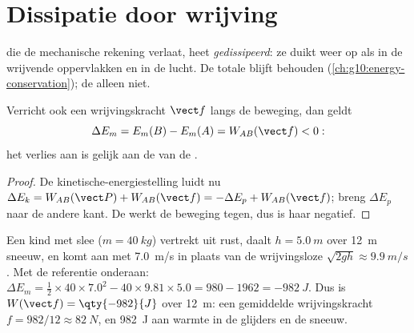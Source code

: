 \section{Dissipatie door wrijving}

\begin{definition}[Dissipatie]\label{def:g11:mechanical-energy:dissipation}
 die de mechanische rekening verlaat, heet
\emph{gedissipeerd}: ze duikt weer op als  in de wrijvende oppervlakken en in de lucht. De totale 
blijft behouden (\cref{ch:g10:energy-conservation}); de  alleen niet.
\end{definition}

\begin{proposition}\label{prop:g11:mechanical-energy:deficit}
Verricht ook een wrijvingskracht $\vect f$  langs de beweging, dan
geldt
\[
\Delta E_m = E_m(B) - E_m(A) = W_{AB}(\vect f) < 0:
\]
het verlies aan  is gelijk aan de  van de
.
\end{proposition}

\begin{proof}
De kinetische-energiestelling luidt nu
$\Delta E_k = W_{AB}(\vect P) + W_{AB}(\vect f) = -\Delta E_p +
W_{AB}(\vect f)$; breng $\Delta E_p$ naar de andere kant. De 
werkt de beweging tegen, dus is haar  negatief.
\end{proof}

\begin{example}\label{ex:g11:mechanical-energy:toboggan}
Een kind met slee ($m = \qty{40}{kg}$) vertrekt uit rust, daalt
$h = \qty{5.0}{m}$ over \qty{12}{m} sneeuw, en komt aan met
\qty{7.0}{m/s} in plaats van de wrijvingsloze
$\sqrt{2gh} \approx \qty{9.9}{m/s}$. Met de referentie onderaan:
$\Delta E_m = \tfrac12 \times 40 \times 7.0^2 - 40 \times 9.81
\times 5.0 = 980 - 1962 = \qty{-982}{J}$. Dus is
$W(\vect f) = \qty{-982}{J}$ over \qty{12}{m}: een gemiddelde
wrijvingskracht $f = 982/12 \approx \qty{82}{N}$, en \qty{982}{J} aan
warmte in de glijders en de sneeuw.
\end{example}

